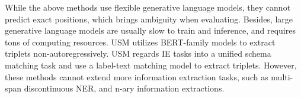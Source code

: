While the above methods use flexible generative language models, they cannot predict exact positions, which brings ambiguity when evaluating.
Besides, large generative language models are usually slow to train and inference, and requires tons of computing resources.
USM \cite{usm} utilizes BERT-family models to extract triplets non-autoregressively.
USM regards IE tasks into a unified schema matching task and use a label-text matching model to extract triplets.
However, these methods cannot extend more information extraction tasks, such as multi-span discontinuous NER, and n-ary information extractions.
